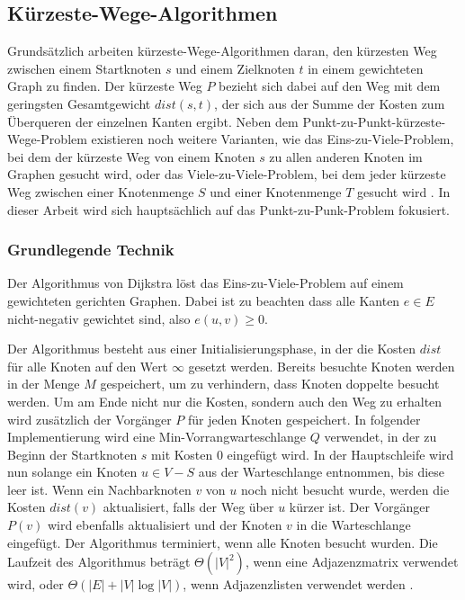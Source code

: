 \subsection{Kürzeste-Wege-Algorithmen}
Grundsätzlich arbeiten kürzeste-Wege-Algorithmen daran, den kürzesten Weg zwischen einem Startknoten
$s$ und einem Zielknoten $t$ in einem gewichteten Graph zu finden. Der kürzeste Weg $P$ bezieht sich
dabei auf den Weg mit dem geringsten Gesamtgewicht $dist(s,t)$, der sich aus der Summe der Kosten
zum Überqueren der einzelnen Kanten ergibt. Neben dem Punkt-zu-Punkt-kürzeste-Wege-Problem
existieren noch weitere Varianten, wie das Eins-zu-Viele-Problem, bei dem der kürzeste Weg von einem
Knoten $s$ zu allen anderen Knoten im Graphen gesucht wird, oder das Viele-zu-Viele-Problem, bei dem
jeder kürzeste Weg zwischen einer Knotenmenge $S$ und einer Knotenmenge $T$ gesucht wird
\cite{Bast.20.04.2015}. In dieser Arbeit wird sich hauptsächlich auf das Punkt-zu-Punk-Problem
fokusiert.\\

\subsubsection{Grundlegende Technik}
Der Algorithmus von Dijkstra löst das Eins-zu-Viele-Problem auf einem gewichteten gerichten Graphen.
Dabei ist zu beachten dass alle Kanten $e \in E$ nicht-negativ gewichtet sind, also $e(u,v) \geq 0$.

Der Algorithmus besteht aus einer Initialisierungsphase, in der die Kosten $dist$ für alle Knoten
auf den Wert $\infty$ gesetzt werden. Bereits besuchte Knoten werden in der Menge $M$ gespeichert,
um zu verhindern, dass Knoten doppelte besucht werden. Um am Ende nicht nur die Kosten, sondern auch
den Weg zu erhalten wird zusätzlich der Vorgänger $P$ für jeden Knoten gespeichert. In folgender
Implementierung wird eine Min-Vorrangwarteschlange $Q$ verwendet, in der zu Beginn der Startknoten $s$ mit
Kosten 0 eingefügt wird. In der Hauptschleife wird nun solange ein Knoten $u \in V - S$ aus der
Warteschlange entnommen, bis diese leer ist. Wenn ein Nachbarknoten $v$ von $u$ noch nicht besucht
wurde, werden die Kosten $dist(v)$ aktualisiert, falls der Weg über $u$ kürzer ist. Der Vorgänger
$P(v)$ wird ebenfalls aktualisiert und der Knoten $v$ in die Warteschlange eingefügt. Der
Algorithmus  terminiert, wenn alle Knoten besucht wurden. Die Laufzeit des Algorithmus beträgt
$\Theta(|V|^2)$, wenn eine Adjazenzmatrix verwendet wird, oder $\Theta(|E| + |V| \log |V|)$, wenn
Adjazenzlisten verwendet werden \cite{intro.algo}.\\


